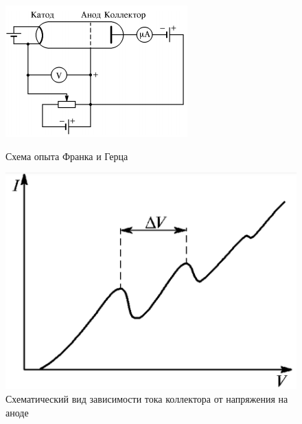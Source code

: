 \documentclass[a4paper,12pt]{article} %
\begin{document}
\begin{figure}[h]
\begin{center}
\begin{minipage}[h]{0.45\linewidth}
\includegraphics[width=1\linewidth]{fig1.PNG}
\caption{Схема опыта Франка и Герца} %
\label{ris:experimoriginal} %
\end{minipage}
\hfill 
\begin{minipage}[h]{0.45\linewidth}
\includegraphics[width=1\linewidth]{fig2.PNG}
\caption{Схематический вид зависимости тока коллектора от напряжения на аноде}
\label{ris:experimcoded}
\end{minipage}
\end{center}
\end{figure}
\end{document}
